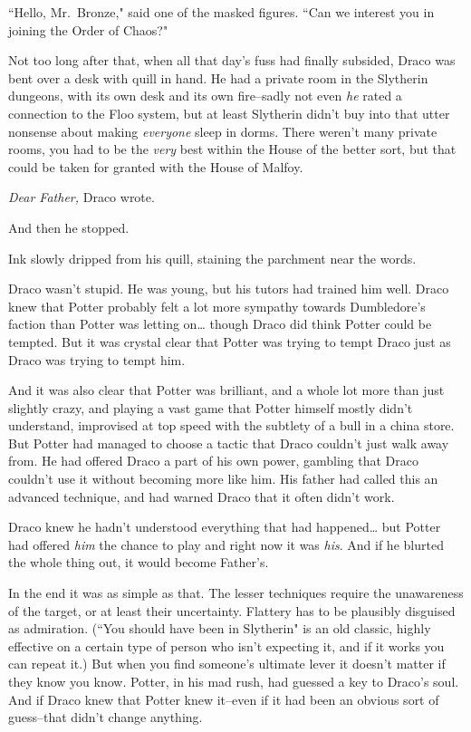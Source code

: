 ``Hello, Mr.~Bronze," said one of the masked figures. ``Can we interest you in joining the Order of Chaos?"


Not too long after that, when all that day's fuss had finally subsided, Draco was bent over a desk with quill in hand. He had a private room in the Slytherin dungeons, with its own desk and its own fire\---sadly not even \emph{he} rated a connection to the Floo system, but at least Slytherin didn't buy into that utter nonsense about making \emph{everyone} sleep in dorms. There weren't many private rooms, you had to be the \emph{very} best within the House of the better sort, but that could be taken for granted with the House of Malfoy.

\emph{Dear Father,} Draco wrote.

And then he stopped.

Ink slowly dripped from his quill, staining the parchment near the words.

Draco wasn't stupid. He was young, but his tutors had trained him well. Draco knew that Potter probably felt a lot more sympathy towards Dumbledore's faction than Potter was letting on{\ldots} though Draco did think Potter could be tempted. But it was crystal clear that Potter was trying to tempt Draco just as Draco was trying to tempt him.

And it was also clear that Potter was brilliant, and a whole lot more than just slightly crazy, and playing a vast game that Potter himself mostly didn't understand, improvised at top speed with the subtlety of a bull in a china store. But Potter had managed to choose a tactic that Draco couldn't just walk away from. He had offered Draco a part of his own power, gambling that Draco couldn't use it without becoming more like him. His father had called this an advanced technique, and had warned Draco that it often didn't work.

Draco knew he hadn't understood everything that had happened{\ldots} but Potter had offered \emph{him} the chance to play and right now it was \emph{his}. And if he blurted the whole thing out, it would become Father's.

In the end it was as simple as that. The lesser techniques require the unawareness of the target, or at least their uncertainty. Flattery has to be plausibly disguised as admiration. (``You should have been in Slytherin" is an old classic, highly effective on a certain type of person who isn't expecting it, and if it works you can repeat it.) But when you find someone's ultimate lever it doesn't matter if they know you know. Potter, in his mad rush, had guessed a key to Draco's soul. And if Draco knew that Potter knew it\---even if it had been an obvious sort of guess\---that didn't change anything.

